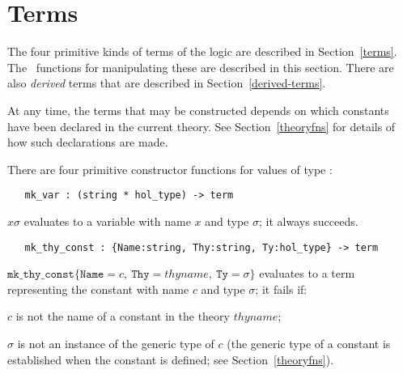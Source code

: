 \section{Terms}\label{avra_terms}

The four primitive kinds of terms of the logic are described in
Section~\ref{terms}.  The \ML\ functions for manipulating these are
described in this section. There are also \emph{derived} terms that
are described in Section~\ref{derived-terms}.

At any time, the terms that may be constructed depends on which
constants have been declared in the current theory. See
Section~\ref{theoryfns} for details of how such declarations are made.

There are four primitive constructor
functions for values of type :

\begin{boxed}
\begin{verbatim}
   mk_var : (string * hol_type) -> term
\end{verbatim}
\end{boxed}

\noindent{}$x$\ml{,}$\sigma$\ml{)} evaluates to a variable
with name $x$ and type $\sigma$; it always succeeds.

\begin{boxed}
\begin{verbatim}
   mk_thy_const : {Name:string, Thy:string, Ty:hol_type} -> term
\end{verbatim}
\end{boxed}

\noindent $\mathtt{mk\_thy\_const}\{\mathtt{Name} = \mathit{c},\
\mathtt{Thy} = \mathit{thyname},\ \mathtt{Ty} = \sigma\}$
 evaluates to a term representing the constant
with name $c$ and type $\sigma$; it fails if:
\begin{myenumerate}
\item $c$ is not the name of a constant in the theory $\mathit{thyname}$;
\item $\sigma$ is not an instance of the generic type of $c$
(the generic type of a constant is established when the constant is defined;
see Section~\ref{theoryfns}).
\end{myenumerate}

